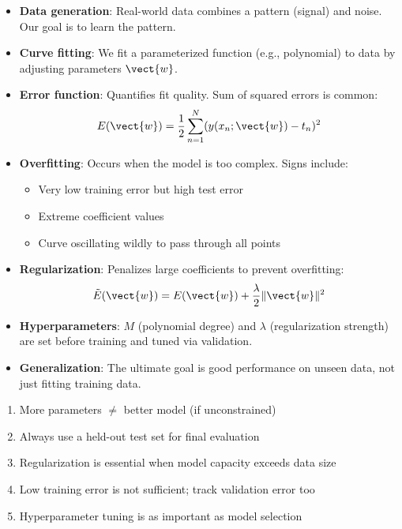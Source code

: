 \begin{itemize}
    \item \textbf{Data generation}: Real-world data combines a pattern (signal) and noise. Our goal is to learn the pattern.
    
    \item \textbf{Curve fitting}: We fit a parameterized function (e.g., polynomial) to data by adjusting parameters $\vect{w}$.
    
    \item \textbf{Error function}: Quantifies fit quality. Sum of squared errors is common:
    \[
    E(\vect{w}) = \frac{1}{2} \sum_{n=1}^{N} (y(x_n; \vect{w}) - t_n)^2
    \]
    
    \item \textbf{Overfitting}: Occurs when the model is too complex. Signs include:
    \begin{itemize}
        \item Very low training error but high test error
        \item Extreme coefficient values
        \item Curve oscillating wildly to pass through all points
    \end{itemize}
    
    \item \textbf{Regularization}: Penalizes large coefficients to prevent overfitting:
    \[
    \tilde{E}(\vect{w}) = E(\vect{w}) + \frac{\lambda}{2} \|\vect{w}\|^2
    \]
    
    \item \textbf{Hyperparameters}: $M$ (polynomial degree) and $\lambda$ (regularization strength) are set before training and tuned via validation.
    
    \item \textbf{Generalization}: The ultimate goal is good performance on unseen data, not just fitting training data.
\end{itemize}

\begin{bluebox}
\begin{enumerate}
    \item More parameters $\neq$ better model (if unconstrained)
    \item Always use a held-out test set for final evaluation
    \item Regularization is essential when model capacity exceeds data size
    \item Low training error is not sufficient; track validation error too
    \item Hyperparameter tuning is as important as model selection
\end{enumerate}
\end{bluebox}
